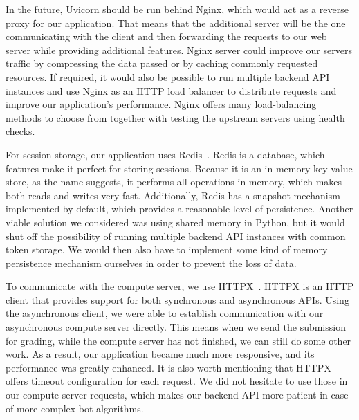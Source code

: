 In the future, Uvicorn should be run behind Nginx, which would act as a reverse proxy for our application. That means that the additional server will be the one communicating with the client and then forwarding the requests to our web server while providing additional features.
Nginx server could improve our servers traffic by compressing the data passed or by caching commonly requested resources. If required, it would also be possible to run multiple backend API instances and use Nginx as an HTTP load balancer to distribute requests and improve our application's performance. Nginx offers many load-balancing methods to choose from together with testing the upstream servers using health checks.


For session storage, our application uses Redis~\cite{redis}. Redis is a database, which features make it perfect for storing sessions. Because it is an in-memory key-value store, as the name suggests, it performs all operations in memory, which makes both reads and writes very fast. Additionally, Redis has a snapshot mechanism implemented by default, which provides a reasonable level of persistence. Another viable solution we considered was using shared memory in Python, but it would shut off the possibility of running multiple backend API instances with common token storage. We would then also have to implement some kind of memory persistence mechanism ourselves in order to prevent the loss of data.


To communicate with the compute server, we use HTTPX~\cite{httpx}. HTTPX is an HTTP client that provides support for both synchronous and asynchronous APIs. Using the asynchronous client, we were able to establish communication with our asynchronous compute server directly. This means when we send the submission for grading, while the compute server has not finished, we can still do some other work. As a result, our application became much more responsive, and its performance was greatly enhanced. It is also worth mentioning that HTTPX offers timeout configuration for each request. We did not hesitate to use those in our compute server requests, which makes our backend API more patient in case of more complex bot algorithms.


